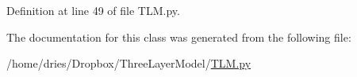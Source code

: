 Definition at line 49 of file T\+L\+M.\+py.



The documentation for this class was generated from the following file\+:\begin{DoxyCompactItemize}
\item 
/home/dries/\+Dropbox/\+Three\+Layer\+Model/\hyperlink{TLM_8py}{T\+L\+M.\+py}\end{DoxyCompactItemize}
